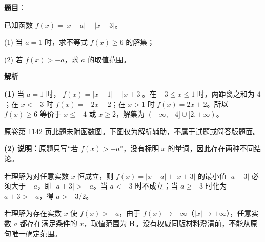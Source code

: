 \begin{answer}

\textbf{题目}：

已知函数 $f(x)=|x-a|+|x+3|$。

  (1) 当 $a=1$ 时，求不等式 $f(x)\geqslant6$ 的解集；

  (2) 若 $f(x)>-a$，求 $a$ 的取值范围。

\makeatletter{}\ifx\@currenvir\gkanswerblock\else\clearpage\fi\makeatother

\textbf{解析}

\textbf{(1)} 当 $a=1$ 时，
$f(x)=|x-1|+|x+3|$。在 $-3\leqslant x\leqslant1$ 时，两距离之和为 $4$；在 $x<-3$ 时 $f(x)=-2x-2$；在 $x>1$ 时 $f(x)=2x+2$。所以 $f(x)\geqslant6$ 等价于 $x\leqslant-4$ 或 $x\geqslant2$，解集为
$(-\infty,-4]\cup[2,+\infty)$。

原卷第 1142 页此题未附函数图。下图仅为解析辅助，不属于试题或简答版题面。
\nopagebreak[4]
\begin{center}\end{center}
\nopagebreak[4]
\textbf{(2) 说明：}原题只写“若 $f(x)>-a$”，没有标明 $x$ 的量词，因此存在两种不同结论。

若理解为对任意实数 $x$ 恒成立，则 $f(x)=|x-a|+|x+3|$ 的最小值 $|a+3|$ 必须大于 $-a$，即 $|a+3|>-a$。当 $a<-3$ 时不成立；当 $a\geqslant-3$ 时化为 $a+3>-a$，得 $a>-3/2$。

若理解为存在实数 $x$ 使 $f(x)>-a$，由于 $f(x)\to+\infty$（$|x|\to+\infty$），任意实数 $a$ 都存在满足条件的 $x$，取值范围为 $\mathbf R$。没有权威同版材料澄清前，不能从原句唯一确定范围。

\gkanswer{答案（1）：$(-\infty,-4]\cup[2,+\infty)$}


\end{answer}